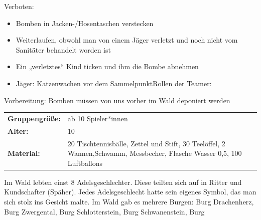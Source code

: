     Verboten: 
    \begin{itemize}
        \item Bomben in Jacken-/Hosentaschen verstecken
        \item Weiterlaufen, obwohl man von einem Jäger verletzt und noch nicht vom Sanitäter behandelt worden ist
        \item Ein „verletztes“ Kind ticken und ihm die Bombe abnehmen
        \item Jäger: Katzenwachen vor dem SammelpunktRollen der Teamer:
        
        
    \end{itemize}
    Vorbereitung: Bomben müssen von uns vorher im Wald deponiert werden
    



\begin{table}[H]
\begin{tabular}{>{\bfseries}lp{8cm}}
   Gruppengröße:   & ab 10 Spieler*innen\\
    Alter: & 10 \\
    Material: & 20 Tischtennisbälle, Zettel und Stift, 30 Teelöffel, 2 Wannen,Schwamm, Messbecher, Flasche Wasser 0,5, 100 Luftballons \\
\end{tabular}
\end{table} 
 Im Wald lebten einst 8 Adelsgeschlechter. Diese teilten sich auf in Ritter und Kundschafter (Späher). Jedes Adelsgeschlecht hatte sein eigenes Symbol, das man sich stolz ins Gesicht malte. Im Wald gab es mehrere Burgen: Burg Drachenherz, Burg Zwergental, Burg Schlotterstein, Burg Schwanenstein, Burg

